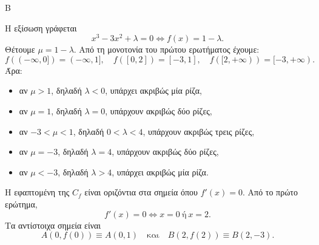\begin{thema}{Β}
\begin{erwthma}
\item Η εξίσωση γράφεται
\[
x^3-3x^2+\lambda=0
\Leftrightarrow f(x)=1-\lambda.
\]
Θέτουμε $\mu=1-\lambda$. Από τη μονοτονία του πρώτου ερωτήματος έχουμε:
\[
f((-\infty,0])=(-\infty,1],\quad
f([0,2])=[-3,1],\quad
f([2,+\infty))=[-3,+\infty).
\]
Άρα:
\begin{itemize}
\item αν $\mu>1$, δηλαδή $\lambda<0$, υπάρχει ακριβώς μία ρίζα,
\item αν $\mu=1$, δηλαδή $\lambda=0$, υπάρχουν ακριβώς δύο ρίζες,
\item αν $-3<\mu<1$, δηλαδή $0<\lambda<4$, υπάρχουν ακριβώς τρεις ρίζες,
\item αν $\mu=-3$, δηλαδή $\lambda=4$, υπάρχουν ακριβώς δύο ρίζες,
\item αν $\mu<-3$, δηλαδή $\lambda>4$, υπάρχει ακριβώς μία ρίζα.
\end{itemize}

\item Η εφαπτομένη της $C_f$ είναι οριζόντια στα σημεία όπου $f'(x)=0$. Από το πρώτο ερώτημα,
\[
f'(x)=0\Leftrightarrow x=0\ \text{ή}\ x=2.
\]
Τα αντίστοιχα σημεία είναι
\[
A(0,f(0))\equiv A(0,1)
\quad\text{και}\quad
B(2,f(2))\equiv B(2,-3).
\]
\end{erwthma}
\end{thema}

